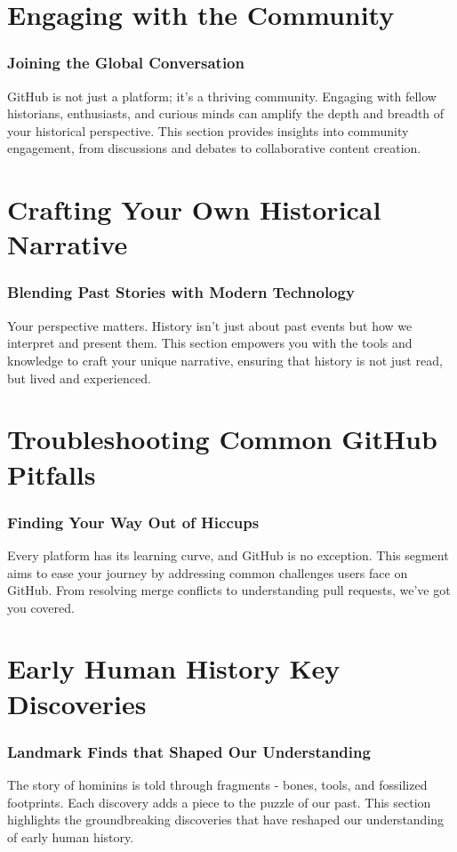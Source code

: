 \documentclass[a4paper,12pt]{book}
\begin{document}
\chapter{Engaging with the Community}
\subsection*{Joining the Global Conversation}
GitHub is not just a platform; it's a thriving community. Engaging with fellow historians, enthusiasts, and curious minds can amplify the depth and breadth of your historical perspective. This section provides insights into community engagement, from discussions and debates to collaborative content creation.

\chapter{Crafting Your Own Historical Narrative}
\subsection*{Blending Past Stories with Modern Technology}
Your perspective matters. History isn't just about past events but how we interpret and present them. This section empowers you with the tools and knowledge to craft your unique narrative, ensuring that history is not just read, but lived and experienced.

\chapter{Troubleshooting Common GitHub Pitfalls}
\subsection*{Finding Your Way Out of Hiccups}
Every platform has its learning curve, and GitHub is no exception. This segment aims to ease your journey by addressing common challenges users face on GitHub. From resolving merge conflicts to understanding pull requests, we've got you covered.



\chapter{Early Human History Key Discoveries}
\subsection*{Landmark Finds that Shaped Our Understanding}
The story of hominins is told through fragments - bones, tools, and fossilized footprints. Each discovery adds a piece to the puzzle of our past. This section highlights the groundbreaking discoveries that have reshaped our understanding of early human history.
\end{document}
